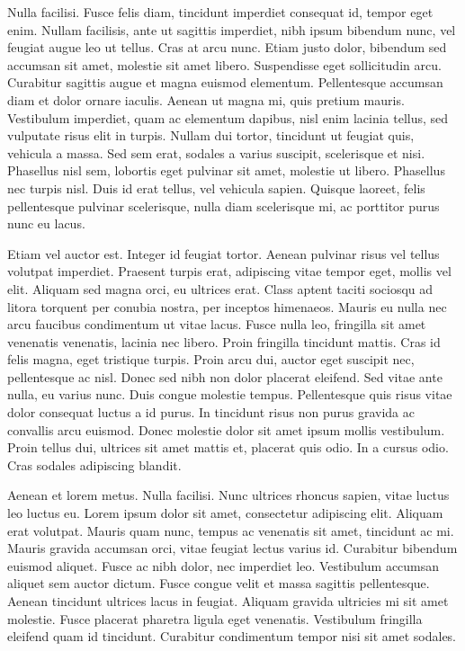Nulla facilisi.
Fusce felis diam, tincidunt imperdiet consequat id, tempor eget enim.
Nullam facilisis, ante ut sagittis imperdiet, nibh ipsum bibendum nunc, vel feugiat augue leo ut tellus.
Cras at arcu nunc.
Etiam justo dolor, bibendum sed accumsan sit amet, molestie sit amet libero.
Suspendisse eget sollicitudin arcu.
Curabitur sagittis augue et magna euismod elementum.
Pellentesque accumsan diam et dolor ornare iaculis.
Aenean ut magna mi, quis pretium mauris.
Vestibulum imperdiet, quam ac elementum dapibus, nisl enim lacinia tellus, sed vulputate risus elit in turpis.
Nullam dui tortor, tincidunt ut feugiat quis, vehicula a massa.
Sed sem erat, sodales a varius suscipit, scelerisque et nisi.
Phasellus nisl sem, lobortis eget pulvinar sit amet, molestie ut libero.
Phasellus nec turpis nisl.
Duis id erat tellus, vel vehicula sapien.
Quisque laoreet, felis pellentesque pulvinar scelerisque, nulla diam scelerisque mi, ac porttitor purus nunc eu lacus.

Etiam vel auctor est.
Integer id feugiat tortor.
Aenean pulvinar risus vel tellus volutpat imperdiet.
Praesent turpis erat, adipiscing vitae tempor eget, mollis vel elit.
Aliquam sed magna orci, eu ultrices erat.
Class aptent taciti sociosqu ad litora torquent per conubia nostra, per inceptos himenaeos.
Mauris eu nulla nec arcu faucibus condimentum ut vitae lacus.
Fusce nulla leo, fringilla sit amet venenatis venenatis, lacinia nec libero.
Proin fringilla tincidunt mattis.
Cras id felis magna, eget tristique turpis.
Proin arcu dui, auctor eget suscipit nec, pellentesque ac nisl.
Donec sed nibh non dolor placerat eleifend.
Sed vitae ante nulla, eu varius nunc.
Duis congue molestie tempus.
Pellentesque quis risus vitae dolor consequat luctus a id purus.
In tincidunt risus non purus gravida ac convallis arcu euismod.
Donec molestie dolor sit amet ipsum mollis vestibulum.
Proin tellus dui, ultrices sit amet mattis et, placerat quis odio.
In a cursus odio.
Cras sodales adipiscing blandit.

Aenean et lorem metus.
Nulla facilisi.
Nunc ultrices rhoncus sapien, vitae luctus leo luctus eu.
Lorem ipsum dolor sit amet, consectetur adipiscing elit.
Aliquam erat volutpat.
Mauris quam nunc, tempus ac venenatis sit amet, tincidunt ac mi.
Mauris gravida accumsan orci, vitae feugiat lectus varius id.
Curabitur bibendum euismod aliquet.
Fusce ac nibh dolor, nec imperdiet leo.
Vestibulum accumsan aliquet sem auctor dictum.
Fusce congue velit et massa sagittis pellentesque.
Aenean tincidunt ultrices lacus in feugiat.
Aliquam gravida ultricies mi sit amet molestie.
Fusce placerat pharetra ligula eget venenatis.
Vestibulum fringilla eleifend quam id tincidunt.
Curabitur condimentum tempor nisi sit amet sodales.

